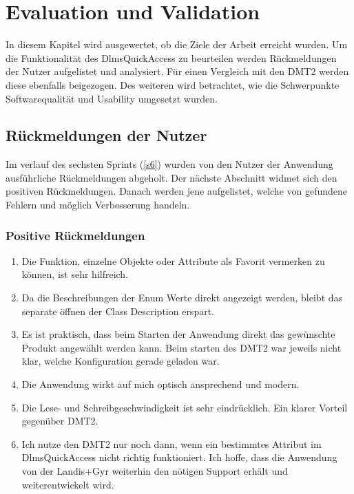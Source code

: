 
\chapter{Evaluation und Validation}\label{eval}
In diesem Kapitel wird ausgewertet, ob die Ziele der Arbeit erreicht wurden.
Um die Funktionalität des DlmsQuickAccess zu beurteilen werden Rückmeldungen der Nutzer aufgelistet und analysiert.
Für einen Vergleich mit den \ac{DMT2} werden diese ebenfalls beigezogen.
Des weiteren wird betrachtet, wie die Schwerpunkte Softwarequalität und Usability umgesetzt wurden.



\section{Rückmeldungen der Nutzer}
Im verlauf des sechsten Sprints (\ref{s6}) wurden von den Nutzer der Anwendung ausführliche Rückmeldungen abgeholt.
Der nächste Abschnitt widmet sich den positiven Rückmeldungen.
Danach werden jene aufgelistet, welche von gefundene Fehlern und möglich Verbesserung handeln.
\subsection{Positive Rückmeldungen}

\begin{enumerate}
   \item Die Funktion, einzelne Objekte oder Attribute als Favorit vermerken zu können, ist sehr hilfreich.
   \item Da die Beschreibungen der Enum Werte direkt angezeigt werden, bleibt das separate öffnen der Class Description erspart.
   \item Es ist praktisch, dass beim Starten der Anwendung direkt das gewünschte Produkt angewählt werden kann. Beim starten des \ac{DMT2} war jeweils nicht klar, welche Konfiguration gerade geladen war.
   \item Die Anwendung wirkt auf mich optisch ansprechend und modern.
   \item Die Lese- und Schreibgeschwindigkeit ist sehr eindrücklich. Ein klarer Vorteil gegenüber \ac{DMT2}.
   \item Ich nutze den \ac{DMT2} nur noch dann, wenn ein bestimmtes Attribut im DlmsQuickAccess nicht richtig funktioniert. Ich hoffe, dass die Anwendung von der Landis+Gyr weiterhin den nötigen Support erhält und weiterentwickelt wird.
\end{enumerate}

